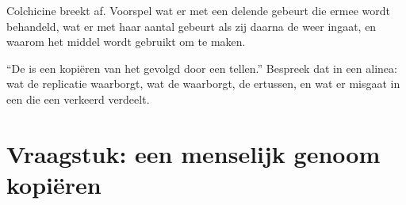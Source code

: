 \begin{exercise}[$\star\star\star$]\label{exo:b1:replication-mitosis:11}
Colchicine breekt  af. Voorspel wat er met een delende  gebeurt die
ermee wordt behandeld, wat er met haar aantal  gebeurt als zij daarna de
 weer ingaat, en waarom het middel wordt gebruikt om  te maken.
\end{exercise}

\begin{exercise}[$\star\star\star$]\label{exo:b1:replication-mitosis:12}
``De  is een kopiëren van het  gevolgd door een tellen.'' Bespreek dat
in een alinea: wat de replicatie waarborgt, wat de  waarborgt, de
 ertussen, en wat er misgaat in een  die een  verkeerd
verdeelt.
\end{exercise}

\section{Vraagstuk: een menselijk genoom kopiëren}

